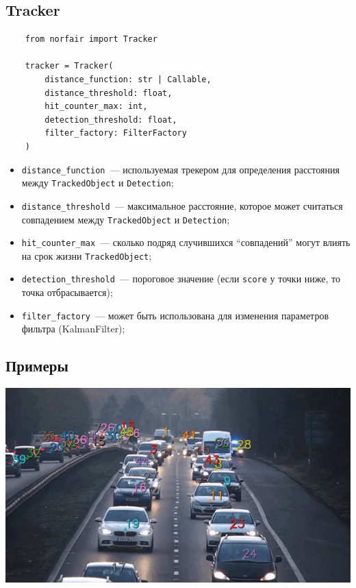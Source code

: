 \subsection{Tracker}
\scriptsize
\begin{verbatim}
    from norfair import Tracker

    tracker = Tracker(
        distance_function: str | Callable,
        distance_threshold: float,
        hit_counter_max: int,
        detection_threshold: float,
        filter_factory: FilterFactory
    )
    \end{verbatim}
\begin{itemize}
    \item \texttt{distance\_function}~--- используемая трекером для определения расстояния между \texttt{TrackedObject} и \texttt{Detection};
    \item \texttt{distance\_threshold}~--- максимальное расстояние, которое может считаться совпадением между \texttt{TrackedObject} и \texttt{Detection};
    \item \texttt{hit\_counter\_max}~--- сколько подряд случившихся \enquote{совпадений} могут влиять на срок жизни \texttt{TrackedObject};
    \item \texttt{detection\_threshold}~--- пороговое значение (если \texttt{score} у точки ниже, то точка отбрасывается);
    \item \texttt{filter\_factory}~--- может быть использована для изменения параметров фильтра (KalmanFilter);
\end{itemize}

\subsection{Примеры}

\includegraphics[scale=0.35]{cars.png}

